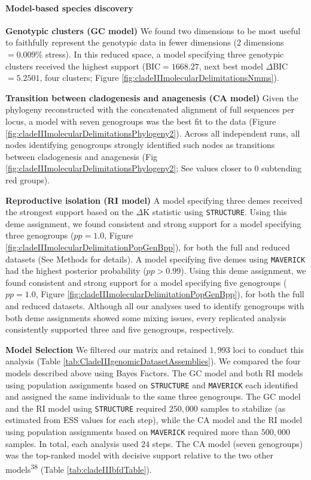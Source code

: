 \documentclass[
  11pt,
]{article}
\begin{document}
\hypertarget{model-based-species-discovery-5}{%
\paragraph{Model-based species discovery}\label{model-based-species-discovery-5}}

\textbf{Genotypic clusters (GC model)} We found two dimensions to be most useful to faithfully represent the genotypic data in fewer dimensions (2 dimensions \(=0.009\%\) stress). In this reduced space, a model specifying three genotypic clusters received the highest support (BIC\(=1668.27\), next best model \(\Delta\)BIC\(=5.2501\), four clusters; Figure \ref{fig:cladeIIImolecularDelimitationsNmms}).

\textbf{Transition between cladogenesis and anagenesis (CA model)} Given the phylogeny reconstructed with the concatenated alignment of full sequences per locus, a model with seven genogroups was the best fit to the data (Figure \ref{fig:cladeIIImolecularDelimitationsPhylogeny2}). Across all independent runs, all nodes identifying genogroups strongly identified such nodes as transitions between cladogenesis and anagenesis (Fig \ref{fig:cladeIIImolecularDelimitationsPhylogeny2}; See values closer to \(0\) subtending red groups).

\textbf{Reproductive isolation (RI model)} A model specifying three demes received the strongest support based on the \(\Delta\)K statistic using \texttt{STRUCTURE}. Using this deme assignment, we found consistent and strong support for a model specifying three genogroups (\(pp=1.0\), Figure \ref{fig:cladeIIImolecularDelimitationPopGenBpp}), for both the full and reduced datasets (See Methods for details). A model specifying five demes using \texttt{MAVERICK} had the highest posterior probability (\(pp>0.99\)). Using this deme assignment, we found consistent and strong support for a model specifying five genogroups (\(pp=1.0\), Figure \ref{fig:cladeIIImolecularDelimitationPopGenBpp}), for both the full and reduced datasets. Although all our analyses used to identify genogroups with both deme assignments showed some mixing issues, every replicated analysis consistently supported three and five genogroups, respectively.

\textbf{Model Selection} We filtered our matrix and retained \(1,993\) loci to conduct this analysis (Table \ref{tab:CladeIIIgenomicDatasetAssemblies}). We compared the four models described above using Bayes Factors. The GC model and both RI models using population assignments based on \texttt{STRUCTURE} and \texttt{MAVERICK} each identified and assigned the same individuals to the same three genogroups. The GC model and the RI model using \texttt{STRUCTURE} required \(250,000\) samples to stabilize (as estimated from ESS values for each step), while the CA model and the RI model using population assignments based on \texttt{MAVERICK} required more than \(500,000\) samples. In total, each analysis used \(24\) steps. The CA model (seven genogroups) was the top-ranked model with decisive support relative to the two other models\textsuperscript{38} (Table \ref{tab:cladeIIIbfdTable}).
\end{document}
